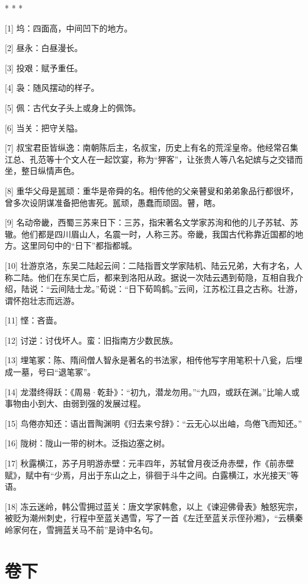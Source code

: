 \documentclass[12pt,UTF8]{ctexbook}
\begin{document}
* * *



[1] 坞：四面高，中间凹下的地方。

[2] 昼永：白昼漫长。

[3] 投艰：赋予重任。

[4] 袅：随风摆动的样子。

[5] 佩：古代女子头上或身上的佩饰。

[6] 当关：把守关隘。

[7] 叔宝君臣皆纵逸：南朝陈后主，名叔宝，历史上有名的荒淫皇帝。他经常召集江总、孔范等十个文人在一起饮宴，称为“狎客”，让张贵人等八名妃嫔与之交错而坐，整日纵情声色。

[8] 重华父母是嚚顽：重华是帝舜的名。相传他的父亲瞽叟和弟弟象品行都很坏，曾多次设阴谋准备把他害死。嚚顽，愚蠢而顽固。瞽，瞎。

[9] 名动帝畿，西蜀三苏来日下：三苏，指宋著名文学家苏洵和他的儿子苏轼、苏辙。他们都是四川眉山人，名震一时，人称三苏。帝畿，我国古代称靠近国都的地方。这里同句中的“日下”都指都城。

[10] 壮游京洛，东吴二陆起云间：二陆指晋文学家陆机、陆云兄弟，大有才名，人称二陆。他们在东吴亡后，都来到洛阳从政。据说一次陆云遇到荀隐，互相自我介绍，陆说：“云间陆士龙。”荀说：“日下荀鸣鹤。”云间，江苏松江县之古称。壮游，谓怀抱壮志而远游。

[11] 悭：吝啬。

[12] 讨逆：讨伐坏人。蛮：旧指南方少数民族。

[13] 埋笔冢：陈、隋间僧人智永是著名的书法家，相传他写字用笔积十八瓮，后埋成一墓，号曰“退笔冢”。

[14] 龙潜终得跃：《周易·乾卦》：“初九，潜龙勿用。”“九四，或跃在渊。”比喻人或事物由小到大、由弱到强的发展过程。

[15] 鸟倦亦知还：语出晋陶渊明《归去来兮辞》：“云无心以出岫，鸟倦飞而知还。”

[16] 陇树：陇山一带的树木。泛指边塞之树。

[17] 秋露横江，苏子月明游赤壁：元丰四年，苏轼曾月夜泛舟赤壁，作《前赤壁赋》，赋中有“少焉，月出于东山之上，徘徊于斗牛之间。白露横江，水光接天”等语。

[18] 冻云迷岭，韩公雪拥过蓝关：唐文学家韩愈，以上《谏迎佛骨表》触怒宪宗，被贬为潮州刺史，行程中至蓝关遇雪，写了一首《左迁至蓝关示侄孙湘》，“云横秦岭家何在，雪拥蓝关马不前”是诗中名句。





\part{卷下}
\end{document}
